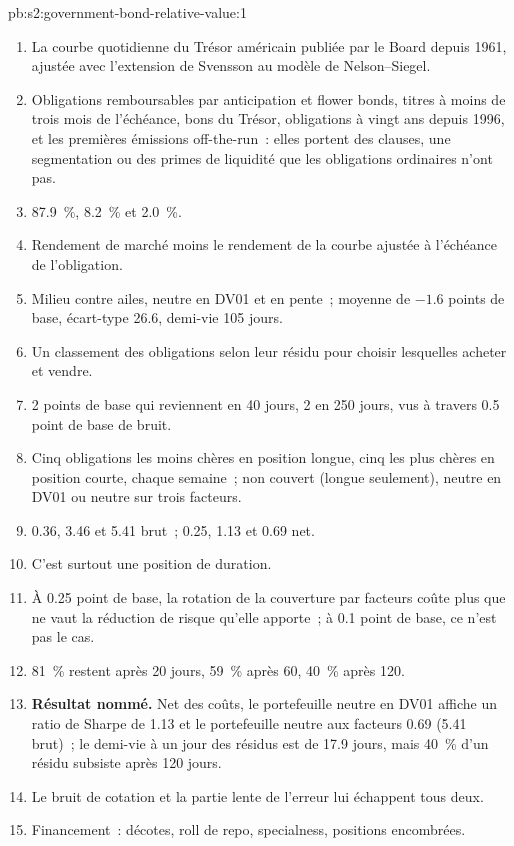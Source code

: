 \begin{solution}{pb:s2:government-bond-relative-value:1}
\begin{enumerate}
\item La courbe quotidienne du Trésor américain publiée par le Board depuis 1961, ajustée avec l'extension de Svensson au modèle de Nelson--Siegel.
\item Obligations remboursables par anticipation et flower bonds, titres à moins de trois mois de l'échéance, bons du Trésor, obligations à vingt ans depuis 1996, et les premières
émissions off-the-run~: elles portent des clauses, une segmentation ou des primes de liquidité que les obligations ordinaires n'ont pas.
\item 87.9~\%, 8.2~\% et 2.0~\%.
\item Rendement de marché moins le rendement de la courbe ajustée à l'échéance de l'obligation.
\item Milieu contre ailes, neutre en DV01 et en pente~; moyenne de $-1.6$ points de base, écart-type 26.6, demi-vie 105 jours.
\item Un classement des obligations selon leur résidu pour choisir lesquelles acheter et vendre.
\item 2 points de base qui reviennent en 40 jours, 2 en 250 jours, vus à travers 0.5 point de base de bruit.
\item Cinq obligations les moins chères en position longue, cinq les plus chères en position courte, chaque semaine~; non couvert (longue seulement), neutre en DV01 ou neutre sur trois facteurs.
\item 0.36, 3.46 et 5.41 brut~; 0.25, 1.13 et 0.69 net.
\item C'est surtout une position de duration.
\item À 0.25 point de base, la rotation de la couverture par facteurs coûte plus que ne vaut la réduction de risque qu'elle apporte~; à 0.1 point de base, ce n'est pas le cas.
\item 81~\% restent après 20 jours, 59~\% après 60, 40~\% après 120.
\item \textbf{Résultat nommé.} Net des coûts, le portefeuille neutre en DV01 affiche un ratio de Sharpe de 1.13 et le portefeuille neutre aux facteurs 0.69 (5.41 brut)~; le
demi-vie à un jour des résidus est de 17.9 jours, mais 40~\% d'un résidu subsiste après 120 jours.
\item Le bruit de cotation et la partie lente de l'erreur lui échappent tous deux.
\item Financement~: décotes, roll de repo, specialness, positions encombrées.

\end{enumerate}
\end{solution}
